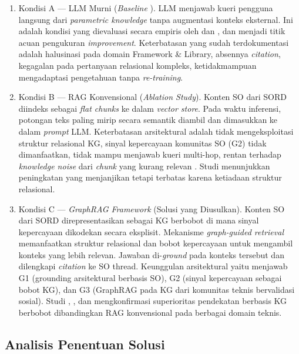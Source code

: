 \begin{enumerate}[label=\textbf{F\arabic*.}]
    \item Kondisi A — LLM Murni (\emph{Baseline} \textcite{DaSilva2025}).
    LLM menjawab kueri pengguna langsung dari \emph{parametric knowledge} tanpa augmentasi konteks eksternal. Ini adalah kondisi yang dievaluasi secara empiris oleh \textcite{DaSilva2025} dan \textcite{Kabir2024}, dan menjadi titik acuan pengukuran \emph{improvement}. Keterbatasan yang sudah terdokumentasi adalah halusinasi pada domain Framework \& Library, absennya \emph{citation}, kegagalan pada pertanyaan relasional kompleks, ketidakmampuan mengadaptasi pengetahuan tanpa \emph{re-training}.
    \item Kondisi B — RAG Konvensional (\emph{Ablation Study}). 
    Konten SO dari SORD diindeks sebagai \emph{flat chunks} ke dalam \emph{vector store}. Pada waktu inferensi, potongan teks paling mirip secara semantik diambil dan dimasukkan ke dalam \emph{prompt} LLM. Keterbatasan arsitektural adalah tidak mengeksploitasi struktur relasional KG, sinyal kepercayaan komunitas SO (G2) tidak dimanfaatkan, tidak mampu menjawab kueri multi-hop, rentan terhadap \emph{knowledge noise} dari \emph{chunk} yang kurang relevan \autocite{Zhou2026}. Studi \textcite{Nashid2023} menunjukkan
    peningkatan yang menjanjikan tetapi terbatas karena ketiadaan struktur relasional.
    \item Kondisi C — \emph{GraphRAG Framework} (Solusi yang Diusulkan).
    Konten SO dari SORD direpresentasikan sebagai KG berbobot di mana sinyal kepercayaan dikodekan secara eksplisit. Mekanisme \emph{graph-guided retrieval} memanfaatkan struktur relasional dan bobot kepercayaan untuk mengambil konteks yang lebih relevan. Jawaban di-\emph{ground} pada konteks tersebut dan dilengkapi \emph{citation} ke SO thread. Keunggulan arsitektural yaitu menjawab G1 (grounding arsitektural berbasis SO), G2 (sinyal kepercayaan sebagai bobot KG), dan G3 (GraphRAG pada KG dari komunitas teknis bervalidasi sosial). Studi \textcite{Zhu2026}, \textcite{Wang2026}, dan \textcite{Zhou2026} mengkonfirmasi superioritas pendekatan berbasis KG berbobot dibandingkan RAG konvensional pada berbagai domain teknis.
\end{enumerate}

\subsection{Analisis Penentuan Solusi}
\label{subsec:penentuan-solusi}


